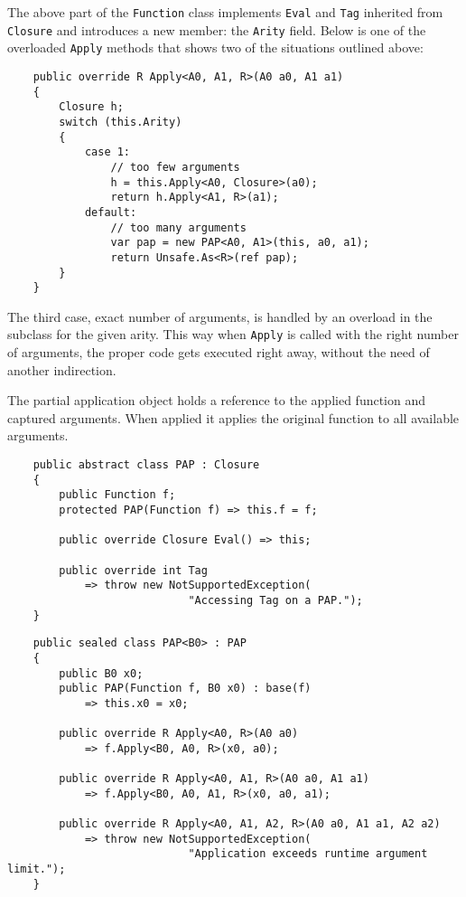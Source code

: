 \documentclass[en]{pracamgr}
\begin{document}
The above part of the \texttt{Function} class implements \texttt{Eval}
and \texttt{Tag} inherited from \texttt{Closure} and introduces
a new member: the \texttt{Arity} field.
Below is one of the overloaded \texttt{Apply} methods that shows
two of the situations outlined above:

\begin{verbatim}
    public override R Apply<A0, A1, R>(A0 a0, A1 a1)
    {
        Closure h;
        switch (this.Arity)
        {
            case 1:
                // too few arguments
                h = this.Apply<A0, Closure>(a0);
                return h.Apply<A1, R>(a1);
            default:
                // too many arguments
                var pap = new PAP<A0, A1>(this, a0, a1);
                return Unsafe.As<R>(ref pap);
        }
    }
\end{verbatim}

The third case, exact number of arguments, is handled
by an overload in the subclass for the given arity.
This way when \texttt{Apply} is called with the right number
of arguments, the proper code gets executed right away,
without the need of another indirection.

The partial application object holds a reference to the
applied function and captured arguments.
When applied it applies the original function to all available arguments.

\begin{verbatim}
    public abstract class PAP : Closure
    {
        public Function f;
        protected PAP(Function f) => this.f = f;

        public override Closure Eval() => this;

        public override int Tag
            => throw new NotSupportedException(
                            "Accessing Tag on a PAP.");
    }
\end{verbatim}
\begin{verbatim}
    public sealed class PAP<B0> : PAP
    {
        public B0 x0;
        public PAP(Function f, B0 x0) : base(f)
            => this.x0 = x0;

        public override R Apply<A0, R>(A0 a0)
            => f.Apply<B0, A0, R>(x0, a0);
        
        public override R Apply<A0, A1, R>(A0 a0, A1 a1) 
            => f.Apply<B0, A0, A1, R>(x0, a0, a1);
        
        public override R Apply<A0, A1, A2, R>(A0 a0, A1 a1, A2 a2)
            => throw new NotSupportedException(
                            "Application exceeds runtime argument limit.");
    }
\end{verbatim}
\end{document}

